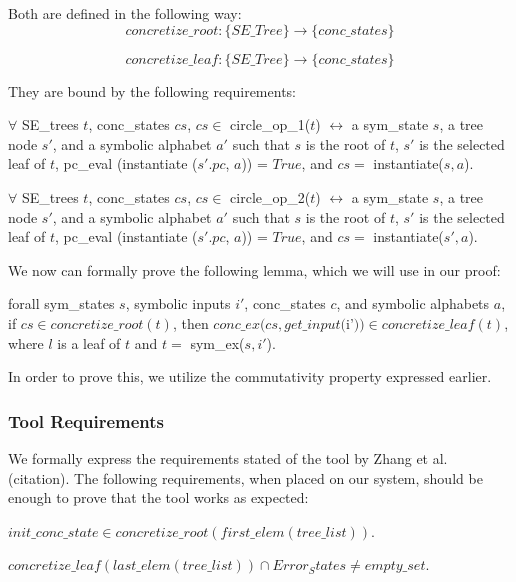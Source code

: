 Both are defined in the following way: 
$$concretize\_root : \{ SE\_Tree \} \rightarrow \{conc\_states\}$$

$$concretize\_leaf : \{ SE\_Tree \} \rightarrow \{conc\_states\}$$

They are bound by the following requirements:

\begin{axiom}
$\forall$ SE_trees $t$,  conc\_states $cs$,
$cs \in$ circle\_op\_1($t$) $\leftrightarrow$ 
\exists a sym\_state $s$, a tree node $s'$, and a symbolic alphabet $a'$ such that
$s$ is the root of $t$, $s'$ is the selected leaf of $t$, 
pc\_eval (instantiate ($s'.pc$, $a$)) = $True$, and 
$cs =$ instantiate($s, a$).
\end{axiom}

\begin{axiom}
$\forall$ SE_trees $t$,  conc\_states $cs$,
$cs \in$ circle\_op\_2($t$) $\leftrightarrow$ 
\exists a sym\_state $s$, a tree node $s'$, and a symbolic alphabet $a'$ such that
$s$ is the root of $t$, $s'$ is the selected leaf of $t$, 
pc\_eval (instantiate ($s'.pc$, $a$)) = $True$, and 
$cs =$ instantiate($s', a$).
\end{axiom}


We now can formally prove the following lemma, which we will use in our proof:
\begin{lemma} \label{cop}
forall sym\_states $s$, symbolic inputs $i'$, conc\_states $c$, and symbolic alphabets $a$,
if $cs \in concretize\_root(t)$,
then 
$conc\_ex(cs, get\_input ($i'$)) \in concretize\_leaf(t)$,
where $l$ is a leaf of $t$ and $t = $ sym\_ex($s, i'$).
\end{lemma}

In order to prove this, we utilize the commutativity property expressed earlier.


\subsubsection{Tool Requirements}
We formally express the requirements stated of the tool by Zhang et al. (citation).
The following requirements, when placed on our system, should be enough to prove that the tool works as expected:
\begin{axiom}[Property $1$]
$init\_conc\_state \in concretize\_root(first\_elem (tree\_list))$.
\end{axiom}

\begin{axiom}[Property $2$]
$ concretize\_leaf (last\_elem (tree\_list)) \cap Error_States 
\neq empty\_set $.
\end{axiom}

